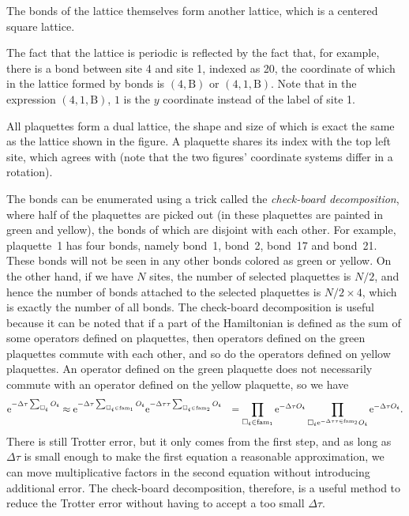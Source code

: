 \documentclass[hyperref, a4paper]{article}
\newcommand*{\ee}{\mathrm{e}}
\def\\{}%
\begin{document}
The bonds of the lattice themselves form another lattice, which is a centered square lattice.

The fact that the lattice is periodic is reflected by the fact that, for example, there is a bond between site 4 and site 1, indexed as 20, the coordinate of which in the lattice formed by bonds is $(4, \text{B})$ or $(4, 1, \text{B})$.
Note that in the expression $(4, 1, \text{B})$, $1$ is the $y$ coordinate instead of the label of site 1.

All plaquettes form a dual lattice, the shape and size of which is exact the same as the lattice shown in the figure.
A plaquette shares its index with the top left site, 
which agrees with  (note that the two figures' coordinate systems differ in a rotation).

The bonds can be enumerated using a trick called the \emph{check-board decomposition}, 
where half of the plaquettes are picked out
(in  these plaquettes are painted in green and yellow), 
the bonds of which are disjoint with each other.
For example, plaquette~1 has four bonds, namely bond~1, bond~2, bond~17 and bond~21.
These bonds will not be seen in any other bonds colored as green or yellow.
On the other hand, if we have $N$ sites, the number of selected plaquettes is $N/2$, 
and hence the number of bonds attached to the selected plaquettes is $N/2 \times 4$, which is exactly the number of all bonds.
The check-board decomposition is useful because it can be noted that if a part of the Hamiltonian is defined as the sum of some operators defined on plaquettes, 
then operators defined on the green plaquettes commute with each other, and so do the operators defined on yellow plaquettes.
An operator defined on the green plaquette does not necessarily commute with an operator defined on the yellow plaquette,
so we have 
\begin{equation}
    \begin{aligned}
        \ee^{-\Delta \tau \sum_{\Box_{\vb*{i}}} O_{\vb*{i}}} &\approx \ee^{- \Delta \tau \sum_{\Box_{\vb*{i}} \in \mathrm{fam}_1} O_{\vb*{i}}} \ee^{- \Delta \tau \tau \sum_{\Box_{\vb*{i}} \in \mathrm{fam}_2} O_{\vb*{i}}}  \\
        &= \prod_{\Box_{\vb*{i}} \in \mathrm{fam}_1} \ee^{- \Delta \tau O_{\vb*{i}}} \prod_{\Box_{\vb*{i}} \ee^{- \Delta \tau \tau \in \mathrm{fam}_2} O_{\vb*{i}}} \ee^{- \Delta \tau O_{\vb*{i}}}.
    \end{aligned}
\end{equation}
There is still Trotter error, but it only comes from the first step, and as long as $\Delta \tau$ is small enough to make the first equation a reasonable approximation, we can move multiplicative factors in the second equation without introducing additional error.
The check-board decomposition, therefore, is a useful method to reduce the Trotter error without having to accept a too small $\Delta \tau$.
\end{document}
